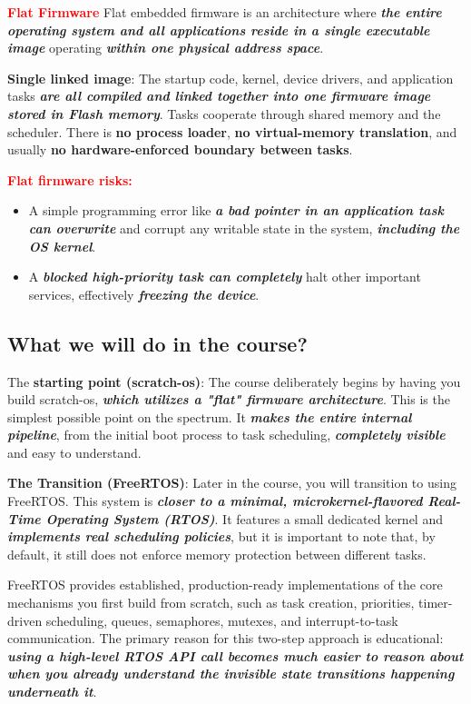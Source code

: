 \textbf{\textcolor{red}{Flat Firmware}}
Flat embedded firmware is an architecture where \textbf{\textit{the entire operating system and all applications reside in a single executable image}} operating \textbf{\textit{within one physical address space}}.   

\textbf{Single linked image}: The startup code, kernel, device drivers, and application tasks \textbf{\textit{are all compiled and linked together into one firmware image stored in Flash memory}}.
Tasks cooperate through shared memory and the scheduler.
There is \textbf{no process loader}, \textbf{no virtual-memory translation}, and usually \textbf{no hardware-enforced boundary between tasks}.

\textbf{\textcolor{red}{Flat firmware risks:}}
\begin{itemize}
    \item A simple programming error like \textbf{\textit{a bad pointer in an application task can overwrite}} and corrupt any writable state in the system, \textbf{\textit{including the OS kernel}}.
    
    \item A \textbf{\textit{blocked high-priority task can completely}} halt other important services, effectively \textbf{\textit{freezing the device}}.
\end{itemize}


\subsection{What we will do in the course?}
The \textbf{starting point (scratch-os)}: The course deliberately begins by having you build scratch-os, \textbf{\textit{which utilizes a "flat" firmware architecture}}. This is the simplest possible point on the spectrum. It \textbf{\textit{makes the entire internal pipeline}}, from the initial boot process to task scheduling, \textbf{\textit{completely visible}} and easy to understand.   

\textbf{The Transition (FreeRTOS)}: Later in the course, you will transition to using FreeRTOS. This system is \textbf{\textit{closer to a minimal, microkernel-flavored Real-Time Operating System (RTOS)}}. It features a small dedicated kernel and \textbf{\textit{implements real scheduling policies}}, but it is important to note that, by default, it still does not enforce memory protection between different tasks. 

FreeRTOS provides established, production-ready implementations of the core mechanisms you first build from scratch, such as task creation, priorities, timer-driven scheduling, queues, semaphores, mutexes, and interrupt-to-task communication. The primary reason for this two-step approach is educational: \textbf{\textit{using a high-level RTOS API call becomes much easier to reason about when you already understand the invisible state transitions happening underneath it}}. 

